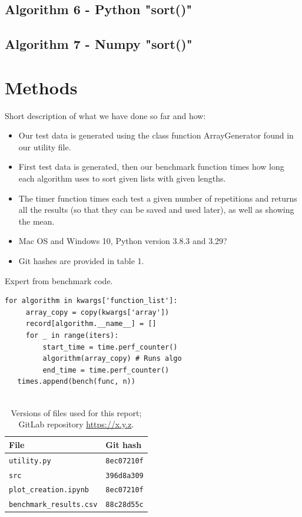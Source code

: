 \documentclass[sigconf, nonacm, natbib, screen, balance=False]{acmart}
\begin{document}
\subsection{Algorithm 6 - Python "sort()" }\label{sec:algo2}



\subsection{Algorithm 7 - Numpy "sort()" }\label{sec:algo2}

\section{Methods}\label{sec:methods}

Short description of what we have done so far and how:
\begin{itemize}
\item Our test data is generated using the class function ArrayGenerator found in our utility file.
\item First test data is generated, then our benchmark function times how long each algorithm uses to sort given lists with given lengths.  
\item The timer function times each test a given number of repetitions and returns all the results (so that they can be saved and used later), as well as showing the mean.
\item Mac OS and Windows 10, Python version 3.8.3 and 3.29?
\item Git hashes are provided in table 1.
\end{itemize}

\begin{listing}
  \caption{Expert from benchmark code.}
  \label{lst:bench_setup}
  \begin{lstlisting}
for algorithm in kwargs['function_list']:
     array_copy = copy(kwargs['array'])
     record[algorithm.__name__] = []
     for _ in range(iters):
         start_time = time.perf_counter()
         algorithm(array_copy) # Runs algo
         end_time = time.perf_counter()
   times.append(bench(func, n))
   
  \end{lstlisting}
\end{listing}

\begin{table}
  \caption{Versions of files used for this report; GitLab repository
    \url{https://x.y.z}.}
  \label{tab:hashes}
  \begin{tabular}{ll}
    \hline
    File & Git hash \\\hline
    \verb!utility.py! & \verb!8ec07210f! \\
    \verb!src! & \verb!396d8a309! \\
    \verb!plot_creation.ipynb! & \verb!8ec07210f! \\
    \verb!benchmark_results.csv! & \verb!88c28d55c! \\\hline
  \end{tabular}
\end{table}
\end{document}
